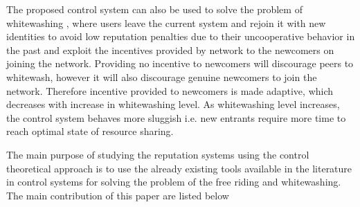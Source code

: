 \documentclass[journal]{IEEEtran}
\begin{document}
The proposed control system can also be used to solve the problem of whitewashing \cite{Feldman}\cite{gupta_whitewashing}, where users leave the current system and rejoin it with new identities to avoid low reputation penalties due to their uncooperative behavior in the past and exploit the incentives provided by network to the newcomers on joining the network. Providing no incentive to newcomers will discourage peers to whitewash, however it will also discourage genuine newcomers to join the network. Therefore incentive provided to newcomers is made adaptive, which decreases with increase in whitewashing level. As whitewashing level increases, the control system behaves more sluggish i.e. new entrants require more time to reach optimal state of resource sharing.  

The main purpose of studying the reputation systems  using the control theoretical approach is to use the already existing tools available in the literature in control systems for solving the problem of the free riding and whitewashing.  The main contribution of this paper are listed below 
\end{document}
